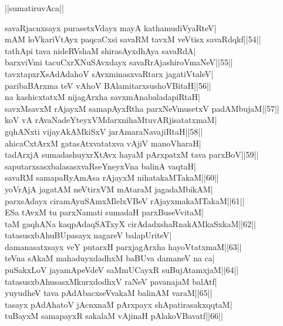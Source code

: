 \documentclass{article}
\begin{document}
\begin{center}
||sumatiruvAca||
\end{center}

savaRjacnxsayx purasetxVdayx mayA kathamudiVyaRteV|\\
mAM loVkariVtAyx paqcaCxsi savaRM tavxM veVtisx savaRdqkf||54||\\
tathApi tava nideRVshaM shirasAyxdhAya savaRdA|\\
barxviVmi tacuCxrXNuSAvxdayx savaRrAjashiroVmaNeV||55||\\
tavxtapxrXsAdAdahoV sAvxminasxvaRtarx jagatiVtaleV|\\
paribaBArxma teV vAhoV BAlamitarxsushoVBitaH||56||\\
na kashicxtatxM nijagArxha savxmAnabaladapiRtaH|\\
savxMsavxM rAjayxM samapAyxRtha parxNeVmusetxV padAMbujaM||57||\\
koV vA rAvaNadeYteyxVMdarxnihaMtuvARjisatatxmaM|\\
gqhANxti vijayAkAMkiSxV jarAmaraNavajiRtaH||58||\\
ahicaCxtArxM gatasAtxvatatxva vAjiV manoVharaH|\\
tadArxjA sumadashuyxrXtAvx hayaM pArxpatxM tava parxBoV||59||\\
saputarxsasxbalasasxvaRseYneyxVna balinA vaqtaH|\\
savaRM samapaRyAmAsa rAjayxM nihatakaMTakaM||60||\\
yoVrAjA jagatAM neVtirxVM mAtaraM jagadaMbikAM|\\
parxsAdayx ciramAyuSAmxMlelxVBeV rAjayxmakaMTakaM||61||\\
ESa tAvxM tu parxNamati sumadaH parxBuseVvitaM|\\
taM gaqhANa kaqpAdaqSATxyX cirAdadxshaRnakAMkaSxkaM||62||\\
tatasusxbAhuBUpasayx nagareV balapUriteV|\\
damanasatxsayx veY putarxH parxjagArxha hayoVtatxmaM||63||\\
teVna sAkaM mahaduyxdadhxM baBUva damaneV na ca|\\
puSakxLoV jayamApeVdeV saMmUCayxR suBujAtamxjaM||64||\\
tatasusxbAhusasxMkurxdodhxV raNeV pavanajaM balAtf|\\
yuyudheV tava pAdAbacxseVvakaM balinAM varaM||65||\\
tasayx pAdAhatoV jAcnxnaM pArxpayx shApatirasakxqqtaM|\\
tuBayxM samapayxR sakalaM vAjinaH pAlakoVBavatf||66||\\
\end{document}
